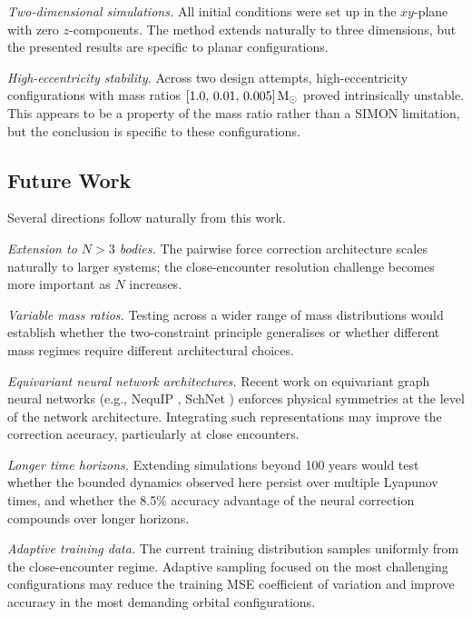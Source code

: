 \documentclass[12pt]{article}
\begin{document}
\textit{Two-dimensional simulations.} All initial conditions were set up in the $xy$-plane
with zero $z$-components. The method extends naturally to three dimensions, but the
presented results are specific to planar configurations.

\textit{High-eccentricity stability.} Across two design attempts, high-eccentricity
configurations with mass ratios $[1.0,\,0.01,\,0.005]\,\rm M_\odot$ proved intrinsically
unstable. This appears to be a property of the mass ratio rather than a SIMON limitation,
but the conclusion is specific to these configurations.

\subsection{Future Work}

Several directions follow naturally from this work.

\textit{Extension to $N > 3$ bodies.} The pairwise force correction architecture scales
naturally to larger systems; the close-encounter resolution challenge becomes more important
as $N$ increases.

\textit{Variable mass ratios.} Testing across a wider range of mass distributions would
establish whether the two-constraint principle generalises or whether different mass
regimes require different architectural choices.

\textit{Equivariant neural network architectures.} Recent work on equivariant graph neural
networks (e.g., NequIP \citep{batzner2022nequip}, SchNet \citep{schutt2018schnet}) enforces
physical symmetries at the level of the network architecture. Integrating such representations
may improve the correction accuracy, particularly at close encounters.

\textit{Longer time horizons.} Extending simulations beyond 100 years would test whether
the bounded dynamics observed here persist over multiple Lyapunov times, and whether the
8.5\% accuracy advantage of the neural correction compounds over longer horizons.

\textit{Adaptive training data.} The current training distribution samples uniformly from
the close-encounter regime. Adaptive sampling focused on the most challenging configurations
may reduce the training MSE coefficient of variation and improve accuracy in the most
demanding orbital configurations.

\newpage


\end{document}
